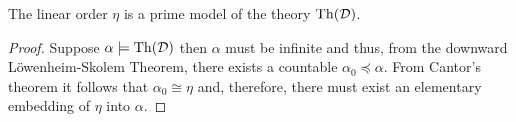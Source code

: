 \begin{thm}
	The linear order $\eta$ is a prime model of the theory $\operatorname{Th}(\mathcal{D})$.
\end{thm}
\begin{proof}
	Suppose $\alpha\models\operatorname{Th}(\mathcal{D})$ then $\alpha$ must be infinite and thus, from the downward L\"owenheim-Skolem Theorem, there exists a countable $\alpha_0\preccurlyeq\alpha$.  From Cantor's theorem it follows that $\alpha_0\cong\eta$ and, therefore, there must exist an elementary embedding of $\eta$ into $\alpha$.
\end{proof}
